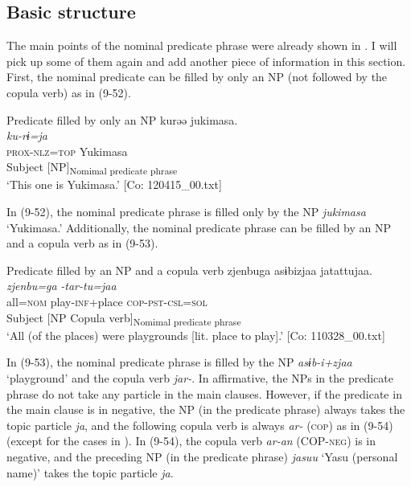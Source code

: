 \subsection{Basic structure}\label{sec:9.3.1}

The main points of the nominal predicate phrase were already shown in . I will pick up some of them again and add another piece of information in this section. First, the nominal predicate can be filled by only an NP (not followed by the copula verb) as in (9-52).

\ea   Predicate filled by only an NP \label{ex:9.52}
 \gllll  kurəə  jukimasa.\\
    \textit{ku-rɨ=ja}  \textit{}\\
    \textsc{prox}-\textsc{nlz}=\textsc{top}  Yukimasa\\
    Subject  [NP]\textsubscript{Nomimal predicate phrase}\\
    \glt     ‘This one is Yukimasa.’ [Co: 120415\_00.txt]
\z

In (9-52), the nominal predicate phrase is filled only by the NP \textit{jukimasa} ‘Yukimasa.’ Additionally, the nominal predicate phrase can be filled by an NP and a copula verb as in (9-53).

\ea   Predicate filled by an NP and a copula verb \label{ex:9.53}
 \gllll  zjenbuga  asɨbizjaa  jatattujaa.\\
    \textit{zjenbu=ga}  \textit{}  \textit{-tar-tu=jaa}\\
    all=\textsc{nom}  play-\textsc{inf}+place  \textsc{cop}-\textsc{pst}-\textsc{csl}=\textsc{sol}\\
    Subject  [NP  Copula verb]\textsubscript{Nomimal predicate phrase}\\
    \glt     ‘All (of the places) were playgrounds [lit. place to play].’ [Co: 110328\_00.txt]
\z

In (9-53), the nominal predicate phrase is filled by the NP \textit{asɨb-i+zjaa} ‘playground’ and the copula verb \textit{jar-}. In affirmative, the NPs in the predicate phrase do not take any particle in the main clauses. However, if the predicate in the main clause is in negative, the NP (in the predicate phrase) always takes the topic particle \textit{ja}, and the following copula verb is always \textit{ar-} (\textsc{cop}) as in (9-54) (except for the cases in ). In (9-54), the copula verb \textit{ar-an} (COP-\textsc{neg}) is in negative, and the preceding NP (in the predicate phrase) \textit{jasuu} ‘Yasu (personal name)’ takes the topic particle \textit{ja}.

